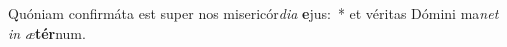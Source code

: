 \item Quóniam confirmáta est super nos misericór\textit{di}\textit{a} \textbf{e}jus:~* et véritas Dómini ma\textit{net} \textit{in} \textit{æ}\textbf{tér}num.
